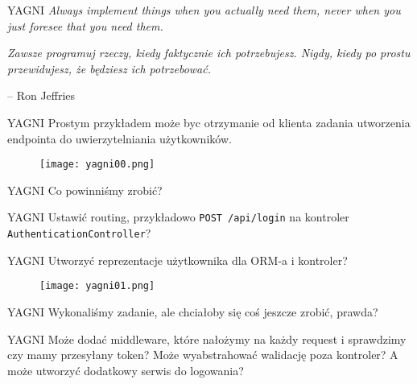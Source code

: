 \begin{frame}{YAGNI}
	\emph{Always implement things when you actually need them, never when you just foresee that you need them.}
	
	\emph{Zawsze programuj rzeczy, kiedy faktycznie ich potrzebujesz. Nigdy, kiedy po prostu przewidujesz, że będziesz ich potrzebować.}
	
	-- Ron Jeffries 
\end{frame}

\begin{frame}{YAGNI}
	Prostym przykładem może byc otrzymanie od klienta zadania utworzenia endpointa do uwierzytelniania użytkowników.
\end{frame}

\begin{frame}
	\begin{figure} \centering
		\texttt{[image: yagni00.png]}
	\end{figure}
\end{frame}

\begin{frame}{YAGNI}
	Co powinniśmy zrobić?
\end{frame}

\begin{frame}{YAGNI}	
	Ustawić routing, przykładowo \texttt{POST /api/login} na kontroler \texttt{AuthenticationController}?
\end{frame}

\begin{frame}{YAGNI}	
	Utworzyć reprezentacje użytkownika dla ORM-a i kontroler?
\end{frame}

\begin{frame}
	\begin{figure} \centering
		\texttt{[image: yagni01.png]}
	\end{figure}
\end{frame}

\begin{frame}{YAGNI}	
	Wykonaliśmy zadanie, ale chciałoby się coś jeszcze zrobić, prawda?
\end{frame}

\begin{frame}{YAGNI}	
	Może dodać middleware, które nałożymy na każdy request i sprawdzimy czy mamy przesyłany token? Może wyabstrahować walidację poza kontroler? A może utworzyć dodatkowy serwis do logowania?
\end{frame}

